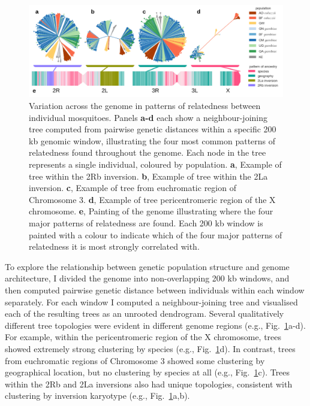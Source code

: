 \begin{refsection}
\begin{figure}[t!]
\centering
\includegraphics[width=1.1\textwidth,center]{artwork/chapter4/treescan.pdf}
\caption{Variation across the genome in patterns of relatedness between individual mosquitoes.
%
Panels \textbf{a-d} each show a neighbour-joining tree computed from pairwise genetic distances within a specific 200 kb genomic window, illustrating the four most common patterns of relatedness found throughout the genome.
%
Each node in the tree represents a single individual, coloured by population.
%
\textbf{a}, Example of tree within the 2Rb inversion.
%
\textbf{b}, Example of tree within the 2La inversion.
%
\textbf{c}, Example of tree from euchromatic region of Chromosome 3.
%
\textbf{d}, Example of tree pericentromeric region of the X chromosome.
%
\textbf{e}, Painting of the genome illustrating where the four major patterns of relatedness are found.
%
Each 200 kb window is painted with a colour to indicate which of the four major patterns of relatedness it is most strongly correlated with.
%
}
\label{fig:treescan}
\end{figure}


To explore the relationship between genetic population structure and genome architecture, I divided the genome into non-overlapping 200 kb windows, and then computed pairwise genetic distance between individuals within each window separately.
%
For each window I computed a neighbour-joining tree and visualised each of the resulting trees as an unrooted dendrogram.
%
Several qualitatively different tree topologies were evident in different genome regions (e.g., Fig.~\ref{fig:treescan}a-d).
%
For example, within the pericentromeric region of the X chromosome, trees showed extremely strong clustering by species (e.g., Fig.~\ref{fig:treescan}d).
%
In contrast, trees from euchromatic regions of Chromosome 3 showed some clustering by geographical location, but no clustering by species at all (e.g., Fig.~\ref{fig:treescan}c).
%
Trees within the 2Rb and 2La inversions also had unique topologies, consistent with clustering by inversion karyotype (e.g., Fig.~\ref{fig:treescan}a,b).



\end{refsection}
